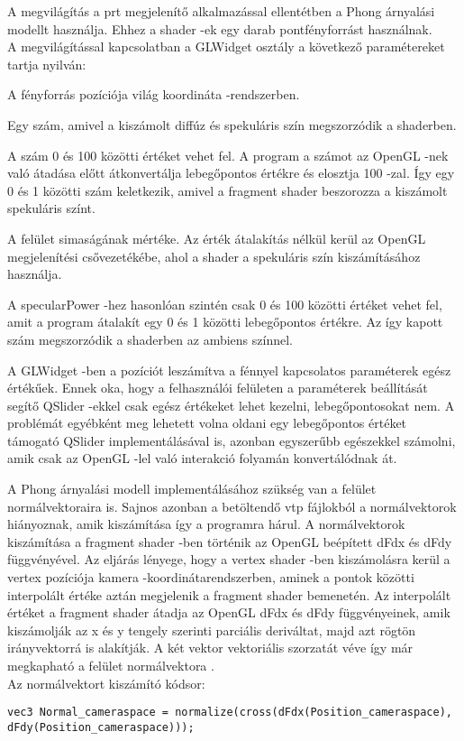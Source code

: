 A megvilágítás a prt megjelenítő alkalmazással ellentétben 
a Phong árnyalási modellt használja. 
Ehhez a shader -ek egy darab pontfényforrást használnak. \\
A megvilágítással kapcsolatban a {\ttfamily GLWidget} osztály 
a következő paramétereket tartja nyilván:
\begin{description}[font=\normalfont\itshape\space]
\item [lightPosition:]
A fényforrás pozíciója világ koordináta -rendszerben. 
\item [lightPower:]
Egy szám, 
amivel a kiszámolt diffúz és spekuláris szín megszorzódik a shaderben.
\item [specularPower:]
A szám 0 és 100 közötti értéket vehet fel. 
A program a számot az OpenGL -nek való átadása előtt átkonvertálja lebegőpontos értékre 
és elosztja 100 -zal. 
Így egy 0 és 1 közötti szám keletkezik, 
amivel a fragment shader beszorozza a kiszámolt spekuláris színt.
\item [smoothness:]
A felület simaságának mértéke. 
Az érték átalakítás nélkül kerül az OpenGL megjelenítési csővezetékébe, 
ahol a shader a spekuláris szín kiszámításához használja.
\item [ambientPower:]
A specularPower -hez hasonlóan szintén csak 0 és 100 közötti értéket vehet fel, 
amit a program átalakít egy 0 és 1 közötti lebegőpontos értékre. 
Az így kapott szám megszorzódik a shaderben az ambiens színnel.
\end{description}

A {\ttfamily GLWidget} -ben a pozíciót leszámítva 
a fénnyel kapcsolatos paraméterek egész értékűek. 
Ennek oka, hogy a felhasználói felületen 
a paraméterek beállítását segítő {\ttfamily QSlider} -ekkel 
csak egész értékeket lehet kezelni, lebegőpontosokat nem. 
A problémát egyébként meg lehetett volna oldani 
egy lebegőpontos értéket támogató {\ttfamily QSlider} implementálásával is, 
azonban egyszerűbb egészekkel számolni, 
amik csak az OpenGL -lel való interakció folyamán konvertálódnak át.

A Phong árnyalási modell implementálásához szükség van a felület normálvektoraira is. 
Sajnos azonban a betöltendő vtp fájlokból a normálvektorok hiányoznak, 
amik kiszámítása így a programra hárul. 
A normálvektorok kiszámítása a fragment shader -ben történik 
az OpenGL beépített {\ttfamily dFdx} és {\ttfamily dFdy} függvényével. 
Az eljárás lényege, hogy a vertex shader -ben kiszámolásra kerül 
a vertex pozíciója kamera -koordinátarendszerben, 
aminek a pontok közötti interpolált értéke aztán megjelenik 
a fragment shader bemenetén. 
Az interpolált értéket a fragment shader átadja 
az OpenGL {\ttfamily dFdx} és {\ttfamily dFdy} függvényeinek, 
amik kiszámolják az x és y tengely szerinti parciális deriváltat, 
majd azt rögtön irányvektorrá is alakítják. 
A két vektor vektoriális szorzatát véve így már megkapható a felület normálvektora \cite{normalvector}. 
\\
Az normálvektort kiszámító kódsor:
\begin{lstlisting}[style=customcpp]
vec3 Normal_cameraspace = normalize(cross(dFdx(Position_cameraspace), dFdy(Position_cameraspace)));
\end{lstlisting}


